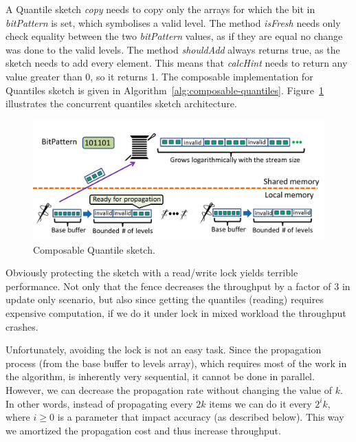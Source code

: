 A Quantile sketch \emph{copy} needs to copy only the arrays for which the bit in \emph{bitPattern}
is set, which symbolises a valid level. The method \emph{isFresh} needs only check equality
between the two \emph{bitPattern} values, as if they are equal no change was done to the valid levels.
The method \emph{shouldAdd} always returns true, as the sketch needs to add every element. This
means that \emph{calcHint} needs to return any value greater than 0, so it returns 1.
The composable implementation for Quantiles sketch is given in Algorithm~\ref{alg:composable-quantiles}.
Figure~\ref{fig:concurrentQuantiles} illustrates the concurrent
quantiles sketch architecture.

\begin{figure}[H]
    \centering
    \includegraphics[width=5in]{images/concurrentQuantiles.png}
    \caption{Composable Quantile sketch.}
    \label{fig:concurrentQuantiles}
\end{figure}

\iffalse
Obviously protecting the sketch with a read/write lock yields
terrible performance. 
Not only that the fence decreases the throughput by a factor of 3
in update only scenario, but also since getting the quantiles
(reading) requires expensive computation, if we do it under lock
in mixed workload the throughput crashes.

Unfortunately, avoiding the lock is not an easy task. 
Since the propagation process (from the base buffer to levels
array), which requires most of the work in the algorithm, is
inherently very sequential, it cannot be done in parallel.
However, we can decrease the propagation rate without changing
the value of $k$. 
In other words, instead of propagating every $2k$ items we can
do it every $2^{i}k$, where $i \geq 0$ is a parameter that
impact accuracy (as described below).
This way we amortized the propagation cost and thus increase
throughput.

